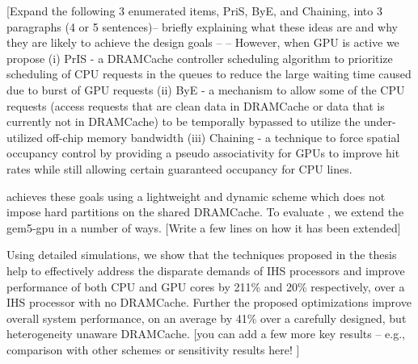 [Expand the following 3 enumerated items, PriS, ByE, and Chaining, into 3
paragraphs (4 or 5 sentences)-- briefly explaining what these ideas are
and why they are likely to achieve the design goals --
--
However, when GPU is active we propose (i) PrIS - a DRAMCache controller
scheduling algorithm to prioritize scheduling of CPU requests in the
queues to reduce the large waiting time caused due to burst of GPU
requests (ii) ByE - a mechanism to allow some of the CPU requests (access
requests that are clean data in DRAMCache or data that is currently not in
DRAMCache) to be temporally bypassed to utilize the under-utilized
off-chip memory bandwidth (iii) Chaining - a technique to force spatial
occupancy control by providing a pseudo associativity for GPUs to improve
hit rates while still allowing certain guaranteed occupancy for CPU lines.

\cachename achieves these goals using a lightweight and dynamic scheme
which does not impose hard partitions on the shared DRAMCache. To evaluate
\cachename, we extend the gem5-gpu \cite{gem5-gpu} in a number of ways.  [Write a
few lines on how it has been extended]

Using detailed simulations, we show that the techniques proposed in the thesis  help to effectively address the disparate demands of IHS
processors and improve performance of both CPU and GPU cores by 211\% and 20\% respectively, over a IHS processor with no DRAMCache.  Further the proposed optimizations improve overall system performance, on an average by 41\% over a carefully designed, but heterogeneity unaware DRAMCache.  
[you can add a few more key results -- e.g., comparison with other schemes
or sensitivity results here! ]

